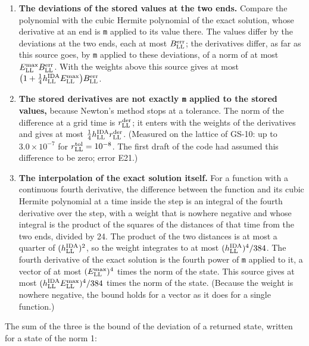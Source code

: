 \documentclass[
  10pt,
]{article}
\providecommand{\tightlist}{%
  \setlength{\itemsep}{0pt}\setlength{\parskip}{0pt}}
\begin{document}
\begin{enumerate}
\def\labelenumi{\arabic{enumi}.}
\tightlist
\item
  \textbf{The deviations of the stored values at the two ends.} Compare
  the polynomial with the cubic Hermite polynomial of the exact
  solution, whose derivative at an end is \texttt{m} applied to its
  value there. The values differ by the deviations at the two ends, each
  at most \(B^{\rm err}_{\rm LL}\); the derivatives differ, as far as
  this source goes, by \texttt{m} applied to these deviations, of a norm
  of at most \(E^{\rm max}_{\rm LL}B^{\rm err}_{\rm LL}\). With the
  weights above this source gives at most
  \(\big(1+\tfrac14h^{\rm IDA}_{\rm LL}E^{\rm max}_{\rm LL}\big)B^{\rm err}_{\rm LL}\).
\item
  \textbf{The stored derivatives are not exactly \texttt{m} applied to
  the stored values,} because Newton's method stops at a tolerance. The
  norm of the difference at a grid time is \(r^{\rm der}_{\rm LL}\); it
  enters with the weights of the derivatives and gives at most
  \(\tfrac14h^{\rm IDA}_{\rm LL}r^{\rm der}_{\rm LL}\). (Measured on the
  lattice of GS-10: up to \(3.0\times10^{-7}\) for
  \(r^{\rm tol}_{\rm LL}=10^{-8}\). The first draft of the code had
  assumed this difference to be zero; error E21.)
\item
  \textbf{The interpolation of the exact solution itself.} For a
  function with a continuous fourth derivative, the difference between
  the function and its cubic Hermite polynomial at a time inside the
  step is an integral of the fourth derivative over the step, with a
  weight that is nowhere negative and whose integral is the product of
  the squares of the distances of that time from the two ends, divided
  by 24. The product of the two distances is at most a quarter of
  \((h^{\rm IDA}_{\rm LL})^2\), so the weight integrates to at most
  \((h^{\rm IDA}_{\rm LL})^4/384\). The fourth derivative of the exact
  solution is the fourth power of \texttt{m} applied to it, a vector of
  at most \((E^{\rm max}_{\rm LL})^4\) times the norm of the state. This
  source gives at most
  \((h^{\rm IDA}_{\rm LL}E^{\rm max}_{\rm LL})^4/384\) times the norm of
  the state. (Because the weight is nowhere negative, the bound holds
  for a vector as it does for a single function.)
\end{enumerate}

The sum of the three is the bound of the deviation of a returned state,
written for a state of the norm 1:
\end{document}
